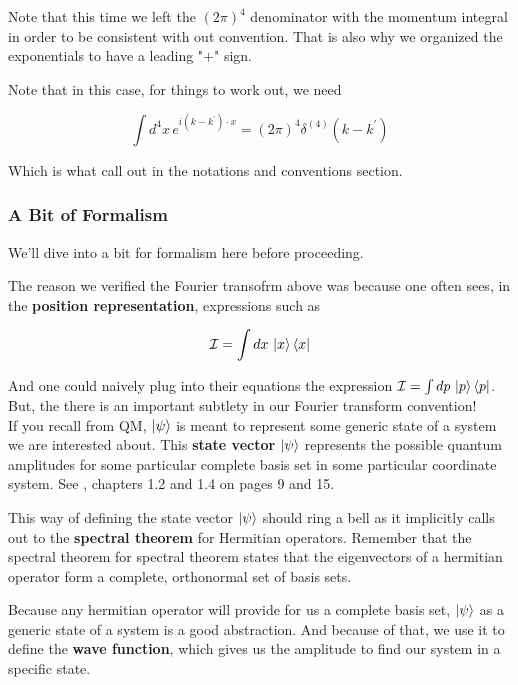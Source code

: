 Note that this time we left the $\left(2\pi\right)^4$ denominator with the momentum integral
in order to be consistent with out convention.
That is also why we organized the exponentials to have a leading "$+$" sign.

Note that in this case, for things to work out, we need

$$
\int d^4 x \, e^{i(k - k^\prime)\cdot x} = \left(2\pi\right)^4 \delta^{(4)} \left(k - k^\prime\right)
$$

Which is what \cite{peskin-and-schroeder} call out in the notations and conventions section.


\subsubsection{A Bit of Formalism}

We'll dive into a bit for formalism here before proceeding.

The reason we verified the Fourier transofrm above was because one often sees, in the
\textbf{position representation}, expressions such as

$$
\mathcal{I} = \int dx \, \ket{x}\bra{x}
$$

And one could naively plug into their equations the expression $\mathcal{I} = \int dp \, \ket{p}\bra{p}$.
But, the there is an important subtlety in our Fourier transform convention!
\\

If you recall from QM, $\ket{\psi}$ is meant to represent some generic state of a system
we are interested about.
This \textbf{state vector} $\ket{\psi}$ represents the possible quantum amplitudes for some particular
complete basis set in some particular coordinate system.
See \cite{binney}, chapters 1.2 and 1.4 on pages 9 and 15.

This way of defining the state vector $\ket{\psi}$
should ring a bell as it implicitly calls out to the \textbf{spectral theorem} for Hermitian operators.
Remember that the spectral theorem for spectral theorem states that the eigenvectors of a hermitian operator
form a complete, orthonormal set of basis sets.

Because any hermitian operator will provide for us a complete basis set, $\ket{\psi}$ as a generic
state of a system is a good abstraction.
And because of that, we use it to define the \textbf{wave function}, which gives us the amplitude to find
our system in a specific state.

